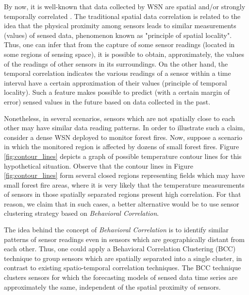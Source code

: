 \documentclass{acm_proc_article-sp}
\begin{document}
By now, it is well-known that data collected by WSN are spatial and/or strongly
temporally correlated \cite{Chu2006, Villas2012, Yoon2005}. The traditional
spatial data correlation is related to the idea that the physical proximity
among sensors leads to similar measurements (values) of sensed data, phenomenon
known as "principle of spatial locality". Thus, one can infer that from the
capture of some sensor readings (located in some regions of sensing space), it
is possible to obtain, approximately, the values of the readings of other
sensors in its surroundings. On the other hand, the temporal correlation
indicates the various readings of a sensor within a time interval have a certain
approximation of their values (principle of temporal locality). Such a feature
makes possible to predict (with a certain margin of error) sensed values in the
future based on data collected in the past.


Nonetheless, in several scenarios, sensors which are not spatially close to each
other may have similar data reading patterns. In order to illustrate such a
claim, consider a dense WSN deployed to monitor forest fires.
Now, suppose a scenario in which the monitored region is affected by dozens of
small forest fires. Figure \ref{fig:contour_lines} depicts a graph of possible
temperature contour lines for this hypothetical situation. Observe that the
contour lines in Figure \ref{fig:contour_lines} form several closed regions
representing fields which may have small forest fire areas, where it is very
likely that the temperature measurements of sensors in those spatially separated
regions present high correlation. For that reason, we claim that in such cases,
a better alternative would be to use sensor clustering strategy based on
\textit{Behavioral Correlation}.

The idea behind the concept of {\it Behavioral Correlation} is to identify
similar patterns of sensor readings even in sensors which are geographically
distant from each other. Thus, one could apply a Behavioral Correlation
Clustering (BCC) technique to group sensors which are spatially separated into a
single cluster, in contrast to existing spatio-temporal correlation techniques.
The BCC technique clusters sensors for which the forecasting models of sensed
data time series are approximately the same, independent of the spatial
proximity of sensors.
\end{document}
